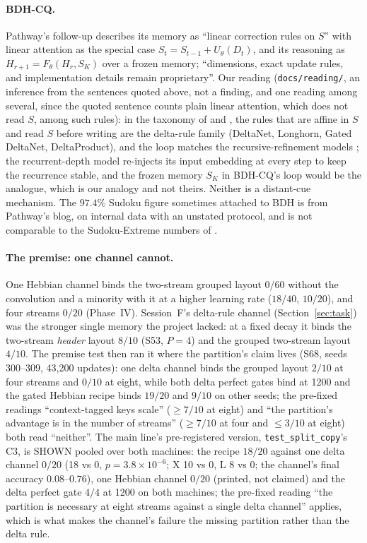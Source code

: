 \documentclass[11pt]{article}
\begin{document}
\paragraph{BDH-CQ.} Pathway's follow-up \cite{bdhcq} describes its memory as ``linear correction rules on $S$'' with linear attention as the special case $S_t = S_{t-1} + U_\theta(D_t)$, and its reasoning as $H_{r+1} = F_\theta(H_r, S_K)$ over a frozen memory; ``dimensions, exact update rules, and implementation details remain proprietary''. Our reading (\texttt{docs/reading/}, an inference from the sentences quoted above, not a finding, and one reading among several, since the quoted sentence counts plain linear attention, which does not read $S$, among such rules): in the taxonomy of \cite{ttr} and \cite{nested}, the rules that are affine in $S$ and read $S$ before writing are the delta-rule family (DeltaNet, Longhorn, Gated DeltaNet, DeltaProduct), and the loop matches the recursive-refinement models \cite{trm, recdepth}; the recurrent-depth model re-injects its input embedding at every step to keep the recurrence stable, and the frozen memory $S_K$ in BDH-CQ's loop would be the analogue, which is our analogy and not theirs. Neither is a distant-cue mechanism. The $97.4\%$ Sudoku figure sometimes attached to BDH is from Pathway's blog, on internal data with an unstated protocol, and is not comparable to the Sudoku-Extreme numbers of \cite{trm}.

\paragraph{The premise: one channel cannot.} One Hebbian channel binds the two-stream grouped layout $0/60$ without the convolution and a minority with it at a higher learning rate ($18/40$, $10/20$), and four streams $0/20$ (Phase~IV). Session~F's delta-rule channel (Section~\ref{sec:task}) was the stronger single memory the project lacked: at a fixed decay it binds the two-stream \emph{header} layout $8/10$ (S53, $P = 4$) and the grouped two-stream layout $4/10$. The premise test then ran it where the partition's claim lives (S68, seeds 300--309, 43{,}200 updates): one delta channel binds the grouped layout $2/10$ at four streams and $0/10$ at eight, while both delta perfect gates bind at 1200 and the gated Hebbian recipe binds $19/20$ and $9/10$ on other seeds; the pre-fixed readings ``context-tagged keys scale'' ($\geq 7/10$ at eight) and ``the partition's advantage is in the number of streams'' ($\geq 7/10$ at four and $\leq 3/10$ at eight) both read ``neither''. The main line's pre-registered version, \texttt{test\_split\_copy}'s C3, is SHOWN pooled over both machines: the recipe $18/20$ against one delta channel $0/20$ (18 vs 0, $p = 3.8\times10^{-6}$; X 10 vs 0, L 8 vs 0; the channel's final accuracy $0.08$--$0.76$), one Hebbian channel $0/20$ (printed, not claimed) and the delta perfect gate $4/4$ at 1200 on both machines; the pre-fixed reading ``the partition is necessary at eight streams against a single delta channel'' applies, which is what makes the channel's failure the missing partition rather than the delta rule.
\end{document}
